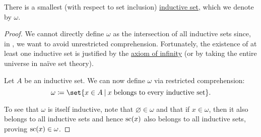 \begin{proposition}\label{thm:smallest_inductive_set_existence}
  There is a smallest (with respect to set inclusion) \hyperref[def:inductive_set]{inductive set}, which we denote by \( \omega \).
\end{proposition}
\begin{proof}
  We cannot directly define \( \omega \) as the intersection of all inductive sets since, in , we want to avoid unrestricted comprehension. Fortunately, the existence of at least one inductive set is justified by the \hyperref[def:zfc/infinity]{axiom of infinity} (or by taking the entire universe in na\"ive set theory).

  Let \( A \) be an inductive set. We can now define \( \omega \) via restricted comprehension:
  \begin{equation*}
    \omega \coloneqq \set{ x \in A \given x \T{belongs to every inductive set} }.
  \end{equation*}

  To see that \( \omega \) is itself inductive, note that \( \varnothing \in \omega \) and that if \( x \in \omega \), then it also belongs to all inductive sets and hence \( \op{sc}(x) \) also belongs to all inductive sets, proving \( \op{sc}(x) \in \omega \).
\end{proof}

